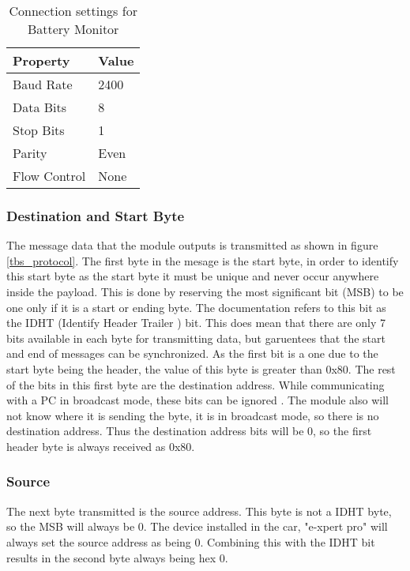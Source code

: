 \begin{table}
\begin{center}
    \begin{tabular}{|l|l|}
        \hline
        Property & Value \\ \hline
        Baud Rate    & 2400 \\
        Data Bits    & 8    \\ 
        Stop Bits    & 1    \\ 
        Parity       & Even \\ 
        Flow Control & None \\
        \hline
    \end{tabular}
	\caption{Connection settings for Battery Monitor}
\end{center}
\end{table}


\subsubsection{Destination and Start Byte}

The message data that the module outputs is transmitted as shown in figure \ref{tbs_protocol}. The first byte in the mesage is the start byte, in order to identify this start byte as the start byte it must be unique and never occur anywhere inside the payload. This is done by reserving the most significant bit (MSB) to be one only if it is a start or ending byte. The documentation refers to this bit as the IDHT (Identify Header Trailer ) bit. This does mean that there are only 7 bits available in each byte for transmitting data, but garuentees that the start and end of messages can be synchronized. As the first bit is a one due to the start byte being the header, the value of this byte is greater than 0x80. The rest of the bits in this first byte are the destination address. While communicating with a PC in broadcast mode, these bits can be ignored \cite{e_xpert}. The module also will not know where it is sending the byte, it is in broadcast mode, so there is no destination address. Thus the destination address bits will be 0, so the first header byte is always received as 0x80.

\subsubsection{Source}

The next byte transmitted is the source address. This byte is not a IDHT byte, so the MSB will always be 0. The device installed in the car, "e-xpert pro" will always set the source address as being 0. Combining this with the IDHT bit results in the second byte always being hex 0.


